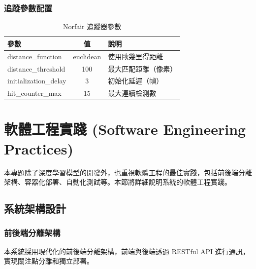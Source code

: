 \documentclass[a4paper,14pt,oneside]{article}
\begin{document}
\subsubsection{追蹤參數配置}
\begin{table}[H]
    \centering
    \caption{Norfair 追蹤器參數}
    \begin{tabular}{|l|c|p{6cm}|}
        \hline
        \textbf{參數} & \textbf{值} & \textbf{說明} \\
        \hline
        distance\_function & euclidean & 使用歐幾里得距離 \\
        \hline
        distance\_threshold & 100 & 最大匹配距離（像素） \\
        \hline
        initialization\_delay & 3 & 初始化延遲（幀） \\
        \hline
        hit\_counter\_max & 15 & 最大連續檢測數 \\
        \hline
    \end{tabular}
\end{table}

\newpage
\section{軟體工程實踐 (Software Engineering Practices)}

本專題除了深度學習模型的開發外，也重視軟體工程的最佳實踐，包括前後端分離架構、容器化部署、自動化測試等。本節將詳細說明系統的軟體工程實踐。

\subsection{系統架構設計}

\subsubsection{前後端分離架構}

本系統採用現代化的前後端分離架構，前端與後端透過 RESTful API 進行通訊，實現關注點分離和獨立部署。
\end{document}
